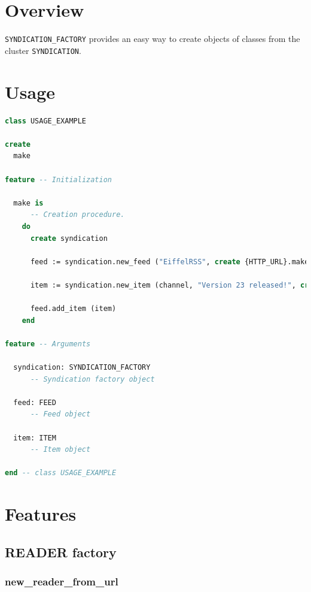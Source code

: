 \section{Overview}
\label{sec:syndication-factory-overview}

\texttt{SYNDICATION\_FACTORY} provides an easy way to create objects
of classes from the cluster \texttt{SYNDICATION}.


\section{Usage}
\label{sec:syndication-factory-usage}

\begin{lstlisting}[language=Eiffel]
class USAGE_EXAMPLE

create 
  make

feature -- Initialization

  make is
      -- Creation procedure.
    do      
      create syndication

      feed := syndication.new_feed ("EiffelRSS", create {HTTP_URL}.make ("http://eiffelrss.berlios.de/"), "EiffelRSS news")

      item := syndication.new_item (channel, "Version 23 released!", create {HTTP_URL}.make ("http://eiffelrss.berlios.de/Main/News"), "Version 23 of EiffelRSS got release today. Happy syndicating!")

      feed.add_item (item)
    end
    
feature -- Arguments

  syndication: SYNDICATION_FACTORY
      -- Syndication factory object

  feed: FEED
      -- Feed object
      
  item: ITEM
      -- Item object
  
end -- class USAGE_EXAMPLE
\end{lstlisting}


\section{Features}
\label{sec:syndication-factory-features}


\subsection{READER factory}
\label{sec:syndication-factory-reader}

\subsubsection{new\_reader\_from\_url }

